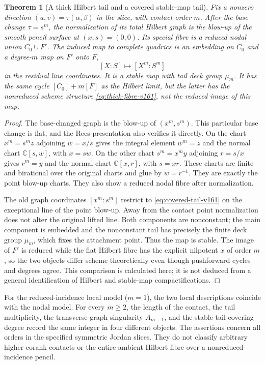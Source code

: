 \documentclass[11pt,reqno]{amsart}
\numberwithin{equation}{section}
\newtheorem{theorem}{Theorem}[section]
\theoremstyle{definition}\newtheorem{definition}[theorem]{Definition}
\theoremstyle{remark}\newtheorem{remark}[theorem]{Remark}
\newcommand{\C}{\mathbb C}\newcommand{\Q}{\mathbb Q}
\begin{document}
\begin{theorem}[A thick Hilbert tail and a covered stable-map tail]
\label{thm:stable-tail-v161}
Fix a nonzero direction $(u,v)=\tau(\alpha,\beta)$ in the slice,
with contact order $m$. After the base change $\tau=s^m$, the
normalization of its total Hilbert graph is the blow-up of the smooth
pencil surface at $(x,s)=(0,0)$. Its special fibre is a reduced nodal
union $C_0\cup F'$. The induced map to complete quadrics is an
embedding on $C_0$ and a degree-$m$ map on $F'$ onto $F$,
\begin{equation}\label{eq:covered-tail-v161}
 [X:S]\longmapsto[X^m:S^m]
\end{equation}
in the residual line coordinates. It is a stable map with tail deck
group $\mu_m$. It has the same cycle $[C_0]+m[F]$ as the Hilbert
limit, but the latter has the nonreduced scheme structure
\eqref{eq:thick-fibre-v161}, not the reduced image of this map.
\end{theorem}
\begin{proof}
The base-changed graph is the blow-up of $(x^m,s^m)$. This particular
base change is flat, and the Rees presentation also verifies it
directly. On the chart $x^m=s^m z$ adjoining $w=x/s$ gives the
integral element $w^m=z$ and the normal chart $\C[s,w]$, with
$x=sw$. On the other chart $s^m=x^m y$ adjoining $r=s/x$ gives
$r^m=y$ and the normal chart $\C[x,r]$, with $s=xr$. These charts
are finite and birational over the original charts and glue by
$w=r^{-1}$. They are exactly the point blow-up charts. They also
show a reduced nodal fibre after normalization.

The old graph coordinates $[x^m:s^m]$ restrict to
\eqref{eq:covered-tail-v161} on the exceptional line of the point
blow-up. Away from the contact point normalization does not alter
the original lifted line. Both components are nonconstant; the
main component is embedded and the nonconstant tail has precisely
the finite deck group $\mu_m$, which fixes the attachment point.
Thus the map is stable. The image of $F'$ is reduced while the flat
Hilbert fibre has the explicit nilpotent $x$ of order $m$, so the
two objects differ scheme-theoretically even though pushforward
cycles and degrees agree. This comparison is calculated here; it is
not deduced from a general identification of Hilbert and stable-map
compactifications.
\end{proof}

For the reduced-incidence local model ($m=1$), the two local
descriptions coincide with the nodal model. For every $m\geq2$,
the length of the contact, the tail multiplicity, the transverse
graph singularity $A_{m-1}$, and the stable tail covering degree
record the same integer in four different objects. The assertions
concern all orders in the specified symmetric Jordan slices. They
do not classify arbitrary higher-corank contacts or the entire
ambient Hilbert fibre over a nonreduced-incidence pencil.
\end{document}
